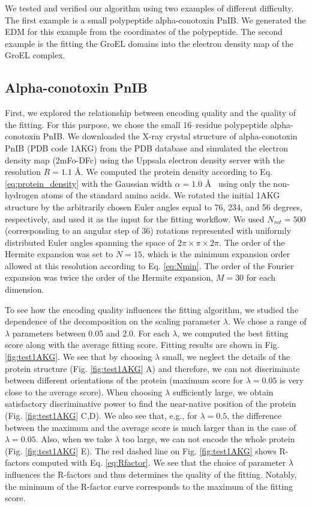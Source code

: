 We tested and verified our algorithm using two examples of different difficulty.
The first example is a small polypeptide alpha-conotoxin
PnIB. We generated the EDM for this example from the coordinates of
the polypeptide. The second example is the fitting the GroEL domains
into the electron density map of the GroEL complex.

\subsection{Alpha-conotoxin PnIB}
First, we explored the relationship between encoding quality and the quality of the fitting. For this purpose, we chose the small 16--residue polypeptide alpha-conotoxin
PnIB. We downloaded the X-ray crystal structure of alpha-conotoxin PnIB (PDB code
1AKG) \cite{Guimond2009} from the PDB database \cite{Berman2000} and
simulated the electron density map (2mFo-DFc) using the Uppsala electron density server \cite{Kleywegt2004} with the resolution $R=1.1$ \AA.
We computed the protein density according to  Eq. \ref{eq:protein_density}
with the Gaussian width $\alpha=1.0$ \AA~ using
only the non-hydrogen atoms of the standard amino acids. We rotated the initial 1AKG structure by the arbitrarily chosen Euler angles equal to 
76, 234, and 56 degrees, respectively, and used it as the input for the fitting workflow.
We used $N_{rot}=500$ (corresponding to an angular step of 36\textdegree ) rotations represented with uniformly 
distributed Euler angles spanning the space of $2\pi\times\pi\times 2\pi$. 
The order of the Hermite expansion
was set to $N=15$, which is the minimum expansion order allowed at this resolution according to Eq. \ref{eq:Nmin}. 
The order of the Fourier expansion was twice the order of the Hermite expansion, $M=30$ for each dimension.

To see how the encoding quality influences the fitting algorithm, we studied the dependence of the decomposition on the scaling
parameter $\lambda$. We chose a range of $\lambda$ parameters between
0.05 and 2.0. For each $\lambda$, we computed the best fitting score along with the average fitting score. 
Fitting results are shown in Fig. \ref{fig:test1AKG}.
We see that by choosing $\lambda$ small,
we neglect the details of the protein structure (Fig. \ref{fig:test1AKG} A) and therefore, we can not discriminate between different orientations
of the protein (maximum score for $\lambda=0.05$ is very close to
the average score). When choosing $\lambda$ sufficiently large, we
obtain satisfactory discriminative power to find the near-native position
of the protein (Fig. \ref{fig:test1AKG} C,D). We also see that,
e.g., for $\lambda=0.5$, the difference between the maximum and the
average score is much larger than in the case of $\lambda=0.05$.
Also, when we take $\lambda$ too large, we can not encode the whole
protein (Fig. \ref{fig:test1AKG} E). 
%
The red dashed line on Fig. \ref{fig:test1AKG} shows R-factors computed with Eq. \ref{eq:Rfactor}.
We see that the choice of parameter $\lambda$ influences the R-factors and thus determines the quality of the fitting. 
Notably, the minimum of the R-factor curve corresponds to the maximum
of the fitting score.


